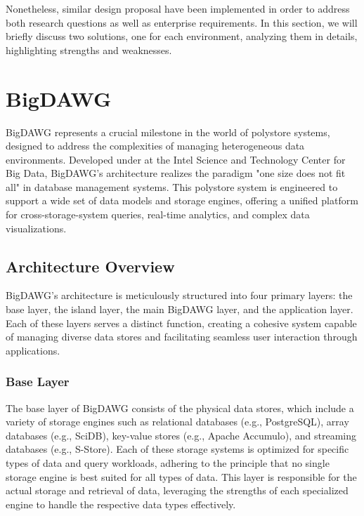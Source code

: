 Nonetheless, similar design proposal have been implemented in order to address both research questions as well as enterprise requirements. In this section, we will briefly discuss two solutions, one for each environment, analyzing them in details, highlighting strengths and weaknesses.

\section{BigDAWG}
\ac{BigDAWG} \cite{DBLP:conf/hpec/GadepallyCDEHKM16} represents a crucial milestone in the world of polystore systems, designed to address the complexities of managing heterogeneous data environments. Developed under at the Intel Science and Technology Center for Big Data, \ac{BigDAWG}'s architecture realizes the paradigm "one size does not fit all" in database management systems. This polystore system is engineered to support a wide set of data models and storage engines, offering a unified platform for cross-storage-system queries, real-time analytics, and complex data visualizations.
\subsection{Architecture Overview}
\ac{BigDAWG}'s architecture is meticulously structured into four primary layers: the base layer, the island layer, the main \ac{BigDAWG} layer, and the application layer. Each of these layers serves a distinct function, creating a cohesive system capable of managing diverse data stores and facilitating seamless user interaction through applications.
\subsubsection{Base Layer}
The base layer of \ac{BigDAWG} consists of the physical data stores, which include a variety of storage engines such as relational databases (e.g., PostgreSQL), array databases (e.g., SciDB), key-value stores (e.g., Apache Accumulo), and streaming databases (e.g., S-Store). Each of these storage systems is optimized for  specific types of data and query workloads, adhering to the principle that no single storage engine is best suited for all types of data. This layer is responsible for the actual storage and retrieval of data, leveraging the strengths of each specialized engine to handle the respective data types effectively.
